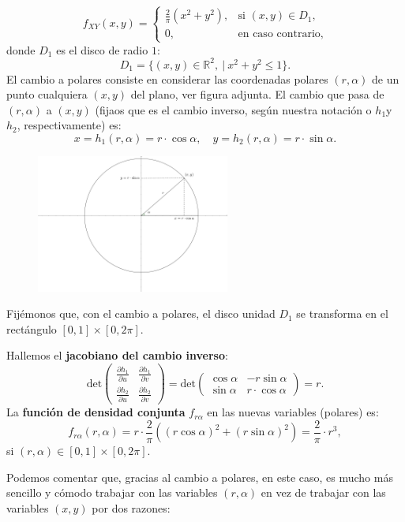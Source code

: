 \documentclass[]{book}
\begin{document}
\[
f_{XY}(x,y)=
\begin{cases}
\frac{2}{\pi}\left(x^2 + y^2\right), & \mbox{si }(x,y)\in D_1, \\
0, & \mbox{en caso contrario,}
\end{cases}
\]
donde \(D_1\) es el disco de radio \(1\):
\[
D_1 = \{(x,y)\in\mathbb{R}^2,\ | \ x^2+y^2\leq 1\}.
\]
El cambio a polares consiste en considerar las coordenadas polares \((r,\alpha)\) de un punto cualquiera \((x,y)\) del plano, ver figura adjunta. El cambio que pasa de \((r,\alpha)\) a \((x,y)\) (fijaos que es el cambio inverso, según nuestra notación o \(h_1\)y \(h_2\), respectivamente) es:
\[
x=h_1(r,\alpha)=r\cdot \cos\alpha,\quad y=h_2(r,\alpha)=r\cdot \sin\alpha.
\]

\begin{figure}
\includegraphics[width=2.5in]{Images/Polares} \end{figure}

Fijémonos que, con el cambio a polares, el disco unidad \(D_1\) se transforma en el rectángulo \([0,1]\times [0,2\pi]\).

Hallemos el \textbf{jacobiano del cambio inverso}:
\[
\mathrm{det}\begin{pmatrix}\frac{\partial h_1}{\partial u} & \frac{\partial h_1}{\partial v}\\ \frac{\partial h_2}{\partial u} & \frac{\partial h_2}{\partial v}\end{pmatrix} =\mathrm{det}\begin{pmatrix}\cos\alpha & -r\sin\alpha\\ \sin\alpha & r\cdot\cos\alpha\end{pmatrix} = r.
\]
La \textbf{función de densidad conjunta} \(f_{r\alpha}\) en las nuevas variables (polares) es:
\[
f_{r\alpha}(r,\alpha)=r\cdot \frac{2}{\pi}\left((r\cos\alpha)^2+(r\sin\alpha)^2\right)=\frac{2}{\pi}\cdot r^3,
\]
si \((r,\alpha)\in [0,1]\times [0,2\pi]\).

Podemos comentar que, gracias al cambio a polares, en este caso, es mucho más sencillo y cómodo trabajar con las variables \((r,\alpha)\) en vez de trabajar con las variables \((x,y)\) por dos razones:
\end{document}
